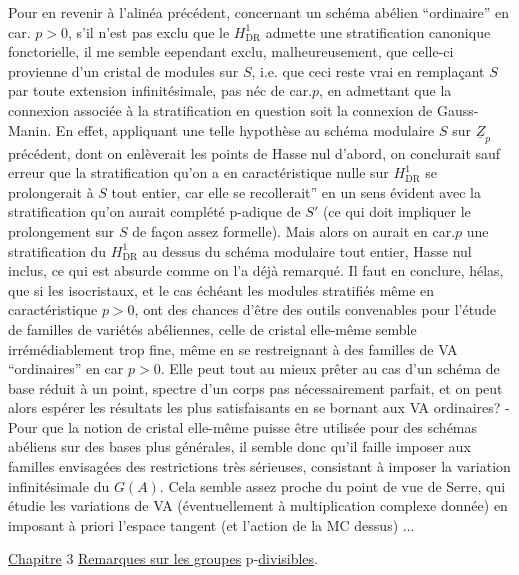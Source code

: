 Pour en revenir à l'alinéa précédent, concernant un schéma abélien ``ordinaire'' en car. $p>0$, s'il n'est pas exclu que le $H^1_{\operatorname{DR}}$ admette une stratification canonique fonctorielle, il me semble eependant exclu, malheureusement, que celle-ci provienne d'un cristal  de modules sur $S$, i.e. que ceci reste vrai en remplaçant $S$ par toute extension infinitésimale, pas néc de car.$p$,  en admettant que la connexion associée à la stratification en question soit la connexion de Gauss-Manin\inserted{)}. En effet, appliquant une telle hypothèse au schéma modulaire $S$ sur $\underline{Z}_p$ précédent, dont on enlèverait les points de Hasse nul d'abord, on conclurait sauf erreur que  la stratification qu'on a en caractéristique nulle sur $H^1_{\operatorname{DR}}$ se prolongerait à $S$ tout entier, car elle se recollerait'' en un sens évident avec la  stratification qu'on aurait   complété p-adique de $S'$ (ce qui doit impliquer le prolongement sur $S$ de façon assez formelle). Mais alors on aurait en car.$p$ une stratification du $H^1_{\operatorname{DR}}$ au dessus du schéma modulaire tout entier, Hasse nul inclus, ce qui est absurde comme on l'a déjà remarqué. Il faut en conclure, hélas, que si les isocristaux, et le cas échéant les modules stratifiés même en caractéristique  $p>0$, ont des chances d'être des outils convenables pour l'étude de familles de variétés abéliennes, celle de cristal elle-même semble irrémédiablement trop fine, même en se restreignant à des familles de VA ``ordinaires'' en car $p>0$. Elle peut tout au mieux  prêter au cas d'un schéma de base réduit à un point, spectre d'un corps pas nécessairement parfait, et on peut alors espérer les résultats les plus satisfaisants en se bornant aux VA ordinaires? - Pour que la notion de cristal elle-même puisse être utilisée pour des schémas abéliens sur des bases plus générales, il semble donc qu'il faille imposer aux familles envisagées des restrictions très sérieuses, consistant à imposer la variation infinitésimale du $G(A)$. Cela semble assez proche du point de vue de Serre, qui étudie les variations de VA (éventuellement à multiplication complexe donnée) en imposant à priori l'espace tangent (et l'action de la MC dessus) ...


\uline{Chapitre} 3 \uline{Remarques sur les groupes} p-\uline{divisibles}.


